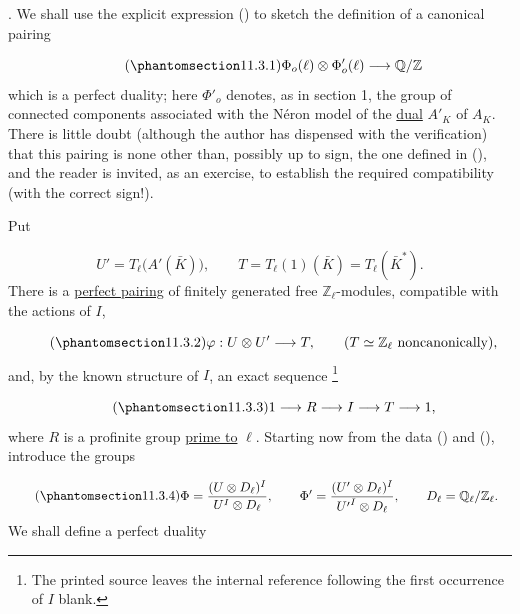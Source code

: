 
\medskip
\noindent
{}. We shall use the explicit expression () to sketch the
definition of a canonical pairing

\begin{equation}\tag{\SGARefTarget{sga7.sga7i.eix.n11-3-1}{11.3.1}}
\Phi_o(\ell)\otimes\Phi'_o(\ell)\longrightarrow\mathbb Q/\mathbb Z
\end{equation}
which is a perfect duality; here $\Phi'_o$ denotes, as in section 1, the
group of connected components associated with the N\'eron model of the
\underline{dual} $A'_K$ of $A_K$. There is little doubt (although the
author has dispensed with the verification) that this pairing is none
other than, possibly up to sign, the one defined in (), and the
reader is invited, as an exercise, to establish the required
compatibility (with the correct sign!).

Put

\begin{equation*}
U'=T_\ell\bigl(A'(\bar K)\bigr),
 \qquad
T=T_\ell(1)(\bar K)=T_\ell(\bar K^*).
\end{equation*}
There is a \underline{perfect pairing} of finitely generated free
$\mathbb Z_\ell$-modules, compatible with the actions of $I$,

\begin{equation}\tag{\SGARefTarget{sga7.sga7i.eix.n11-3-2}{11.3.2}}
\varphi:U\otimes U'\longrightarrow T,
 \qquad (T\simeq\mathbb Z_\ell\text{ noncanonically}),
\end{equation}
and, by the known structure of $I$, an exact sequence
\footnote{The printed source leaves the internal reference following
the first occurrence of $I$ blank.}

\begin{equation}\tag{\SGARefTarget{sga7.sga7i.eix.n11-3-3}{11.3.3}}
1\longrightarrow R\longrightarrow I\longrightarrow T\longrightarrow1,
\end{equation}
where $R$ is a profinite group \underline{prime to} $\ell$. Starting now
from the data () and (), introduce the groups

\begin{equation}\tag{\SGARefTarget{sga7.sga7i.eix.n11-3-4}{11.3.4}}
\begin{aligned}
\Phi&=\frac{(U\otimes D_\ell)^I}{U^I\otimes D_\ell},\qquad
\Phi'=\frac{(U'\otimes D_\ell)^I}{{U'}^I\otimes D_\ell},\qquad
D_\ell=\mathbb Q_\ell/\mathbb Z_\ell.
\end{aligned}
\end{equation}
We shall define a perfect duality

